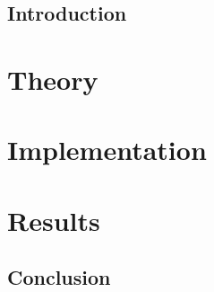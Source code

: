 \documentclass[11pt,a4wide]{book}
\numberwithin{equation}{section}
\begin{document}
 

\cleardoublepage

\doublespacing
\tableofcontents
\singlespacing
 
\chapter{Introduction}

 

\part{Theory} 

 
\part{Implementation}


\part{Results}


\chapter{Conclusion}





 
\end{document}
